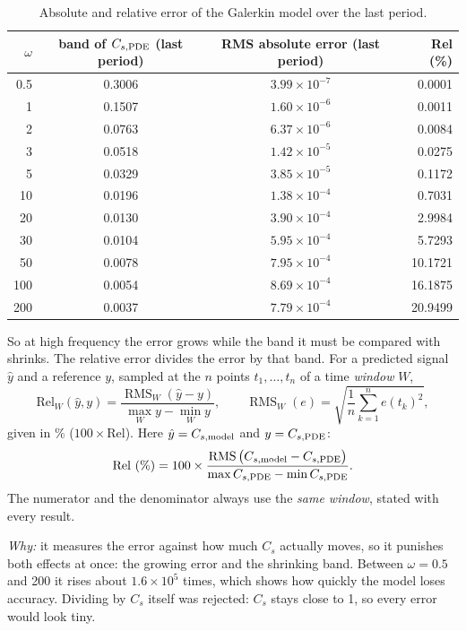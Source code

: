 \documentclass[11pt,a4paper]{article}
\newcommand{\why}{\textit{Why:} }
\newcommand{\RMS}{\operatorname{RMS}}
\begin{document}
\begin{table}[H]\centering\small
\begin{tabular}{rccr}\toprule
$\omega$ & band of $C_{s,\rm PDE}$ (last period) & RMS absolute error (last period) & Rel (\%)\\\midrule
0.5 & 0.3006 & $3.99\times10^{-7}$ & 0.0001\\
1 & 0.1507 & $1.60\times10^{-6}$ & 0.0011\\
2 & 0.0763 & $6.37\times10^{-6}$ & 0.0084\\
3 & 0.0518 & $1.42\times10^{-5}$ & 0.0275\\
5 & 0.0329 & $3.85\times10^{-5}$ & 0.1172\\
10 & 0.0196 & $1.38\times10^{-4}$ & 0.7031\\
20 & 0.0130 & $3.90\times10^{-4}$ & 2.9984\\
30 & 0.0104 & $5.95\times10^{-4}$ & 5.7293\\
50 & 0.0078 & $7.95\times10^{-4}$ & 10.1721\\
100 & 0.0054 & $8.69\times10^{-4}$ & 16.1875\\
200 & 0.0037 & $7.79\times10^{-4}$ & 20.9499\\\bottomrule
\end{tabular}
\caption{Absolute and relative error of the Galerkin model over the last period.}
\end{table}
So at high frequency the error grows while the band it must be compared with shrinks. The relative error divides the error by that band. For a predicted signal $\hat y$ and a reference $y$, sampled at the $n$ points $t_1,\dots,t_n$ of a time \emph{window} $W$,
\begin{equation}\label{eq:rel}
  \mathrm{Rel}_W(\hat y,y) = \frac{\RMS_W(\hat y-y)}{\max_W y-\min_W y},\qquad
  \RMS_W(e)=\sqrt{\frac1n\sum_{k=1}^{n}e(t_k)^2},
\end{equation}
given in \% ($100\times$Rel). Here $\hat y=C_{s,\rm model}$ and $y=C_{s,\rm PDE}$:
\[
  \mathrm{Rel}\ (\%) = 100\times\frac{\RMS\big(C_{s,\rm model}-C_{s,\rm PDE}\big)}{\max C_{s,\rm PDE}-\min C_{s,\rm PDE}}.
\]
The numerator and the denominator always use the \emph{same window}, stated with every result.

\why it measures the error against how much $C_s$ actually moves, so it punishes both effects at once: the growing error and the shrinking band. Between $\omega=0.5$ and 200 it rises about $1.6\times10^5$ times, which shows how quickly the model loses accuracy. Dividing by $C_s$ itself was rejected: $C_s$ stays close to 1, so every error would look tiny.
\end{document}
